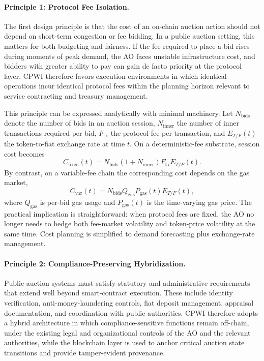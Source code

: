\documentclass[runningheads]{llncs}
\begin{document}
\paragraph{Principle 1: Protocol Fee Isolation.}
The first design principle is that the cost of an on-chain auction action should
not depend on short-term congestion or fee bidding. In a public auction setting,
this matters for both budgeting and fairness. If the fee required to place a bid
rises during moments of peak demand, the AO faces unstable infrastructure cost,
and bidders with greater ability to pay can gain de facto priority at the protocol
layer. CPWI therefore favors execution environments in which identical
operations incur identical protocol fees within the planning horizon relevant to
service contracting and treasury management.

This principle can be expressed analytically with minimal machinery. Let
$N_{\text{bids}}$ denote the number of bids in an auction session, $N_{\text{inner}}$
the number of inner transactions required per bid, $F_{\text{tx}}$ the protocol fee per
transaction, and $E_{T/F}(t)$ the token-to-fiat exchange rate at time $t$. On a
deterministic-fee substrate, session cost becomes
\begin{equation}
C_{\text{fixed}}(t) = N_{\text{bids}}(1 + N_{\text{inner}})F_{\text{tx}}E_{T/F}(t).
\end{equation}
By contrast, on a variable-fee chain the corresponding cost depends on the gas
market,
\begin{equation}
C_{\text{var}}(t) = N_{\text{bids}}Q_{\text{gas}}P_{\text{gas}}(t)E_{T/F}(t),
\end{equation}
where $Q_{\text{gas}}$ is per-bid gas usage and $P_{\text{gas}}(t)$ is the time-varying gas
price. The practical implication is straightforward: when protocol fees are fixed,
the AO no longer needs to hedge both fee-market volatility and token-price
volatility at the same time. Cost planning is simplified to demand forecasting
plus exchange-rate management.

\paragraph{Principle 2: Compliance-Preserving Hybridization.}
Public auction systems must satisfy statutory and administrative requirements
that extend well beyond smart-contract execution. These include identity
verification, anti-money-laundering controls, fiat deposit management, appraisal
documentation, and coordination with public authorities. CPWI therefore adopts
a hybrid architecture in which compliance-sensitive functions remain off-chain,
under the existing legal and organizational controls of the AO and the relevant
authorities, while the blockchain layer is used to anchor critical auction state
transitions and provide tamper-evident provenance.
\end{document}
